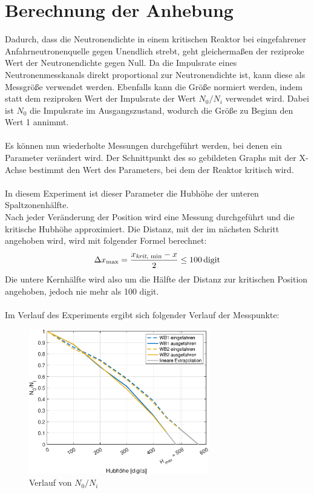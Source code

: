 \documentclass[12pt,german]{article}
\begin{document}
    \section{Berechnung der Anhebung}
    Dadurch, dass die Neutronendichte in einem kritischen Reaktor bei eingefahrener Anfahrneutronenquelle gegen Unendlich strebt, geht gleichermaßen der reziproke Wert der Neutronendichte gegen Null.
    Da die Impulsrate eines Neutronenmesskanals direkt proportional zur Neutronendichte ist, kann diese als Messgröße verwendet werden.
    Ebenfalls kann die Größe normiert werden, indem statt dem reziproken Wert der Impulsrate der Wert $N_0 / N_i$ verwendet wird. Dabei ist $N_0$ die Impulsrate im Ausgangszustand, wodurch die Größe zu Beginn den Wert 1 annimmt.
    \\ \\
    Es können nun wiederholte Messungen durchgeführt werden, bei denen ein Parameter verändert wird. Der Schnittpunkt des so gebildeten Graphs mit der X-Achse bestimmt den Wert des Parameters, bei dem der Reaktor kritisch wird.
    \\ \\
    In diesem Experiment ist dieser Parameter die Hubhöhe der unteren Spaltzonenhälfte.
    \\
    Nach jeder Veränderung der Position wird eine Messung durchgeführt und die kritische Hubhöhe approximiert. Die Distanz, mit der im nächsten Schritt angehoben wird, wird mit folgender Formel berechnet:
    \begin{align*}
        \Delta x_\text{max} = \frac{x_\text{\emph{krit}, min} - x}{2} \leq 100\, \text{digit}
    \end{align*}
    Die untere Kernhälfte wird also um die Hälfte der Distanz zur kritischen Position angehoben, jedoch nie mehr als 100 digit.
    \\ \\
    Im Verlauf des Experiments ergibt sich folgender Verlauf der Messpunkte:
    \begin{figure}[H]
        \centering
        \includegraphics[width=0.7\textwidth]{relativeCount.eps}
        \caption{Verlauf von $N_0 / N_i$}
        \label{fig:relativeCount}
    \end{figure}
\end{document}
